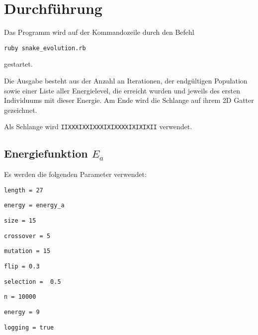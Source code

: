 \documentclass[parskip=half,paper=a4]{scrartcl}
\begin{document}
  \section{Durchführung}
    Das Programm wird auf der Kommandozeile durch den Befehl
    \begin{lstlisting}[gobble=6]
      ruby snake_evolution.rb
    \end{lstlisting}
    gestartet.
    
    Die Ausgabe besteht aus der Anzahl an Iterationen, der endgültigen
    Population sowie einer Liste aller Energielevel, die erreicht wurden und
    jeweils des ersten Individuums mit dieser Energie.
    Am Ende wird die Schlange auf ihrem 2D Gatter gezeichnet.
  
    Als Schlange wird \texttt{IIXXXIXXIXXXIXIXXXXIXIXIXII} verwendet.
    
  \subsection{Energiefunktion $E_a$} 
    Es werden die folgenden Parameter verwendet:
    \begin{compactitem}[--]
      \item \lstinline-length = 27-
      \item \lstinline-energy = energy_a-
      \item \lstinline-size = 15-
      \item \lstinline-crossover = 5-
      \item \lstinline-mutation = 15-
      \item \lstinline-flip = 0.3-
      \item \lstinline-selection =  0.5-
      \item \lstinline-n = 10000-
      \item \lstinline-energy = 9-
      \item \lstinline-logging = true-
    \end{compactitem}
  
\end{document}
